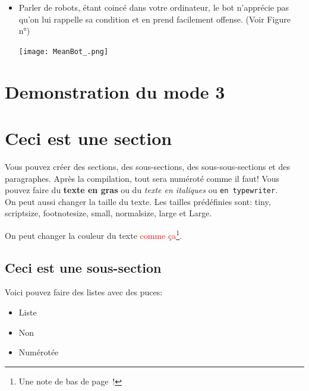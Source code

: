 \documentclass[paper=a4, fontsize=11pt]{article}
\begin{document}
\begin{itemize}
\item Parler de robots, étant coincé dans votre ordinateur, le bot n'apprécie pas qu'on lui rappelle sa condition et en prend facilement offense. (Voir Figure n°)

\begin{center}
\texttt{[image: MeanBot\_.png]}
\end{center}

\end{itemize}

\section{Demonstration du mode 3}



















\section{Ceci est une section}
Vous pouvez créer des sections, des sous-sections, des sous-sous-sections et des paragraphes. Après
la compilation, tout sera numéroté comme il faut! Vous pouvez faire du \textbf{texte en gras} ou du
\textit{texte en italiques} ou \texttt{en typewriter}. \\

On peut aussi {\small changer} {\large la taille} {\tiny du texte}.  Les tailles prédéfinies sont:
{\tiny tiny}, {\scriptsize scriptsize}, {\footnotesize footnotesize}, {\small small}, {\normalsize
  normalsize}, {\large large} et {\Large Large}.

On peut changer la couleur du texte \textcolor{red}{comme
  ça}\footnote{Une note de bas de page~!}.

\subsection{Ceci est une sous-section}
Voici pouvez faire des listes avec des puces:

\begin{itemize}
\item Liste
\item Non
\item Numérotée
\end{itemize}
\end{document}
